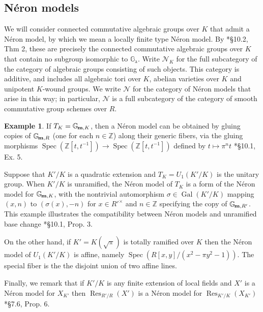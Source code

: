\documentclass[10pt]{amsart}
\theoremstyle{plain}
\theoremstyle{definition}
\newtheorem{example}[theorem]{Example}
\newcommand{\ZZ}{{\mathbb{Z}}}
\newcommand{\Gm}[1]{\mathbb{G}_{\hskip-1pt\textbf{m},#1}}
\DeclareMathOperator{\Gal}{Gal}
\DeclareMathOperator{\Res}{Res}
\newcommand{\Spec}[1]{{\operatorname{Spec}(#1)}}
\begin{document}
\subsection{N\'eron models}\label{ssec:neron}
We will consider connected commutative algebraic groups over $K$ that admit a N\'eron model,
by which we mean a locally finite type N\'eron model.
By \cite{bosch-lutkebohmert-reynaud:NeronModels}*{\S 10.2, Thm 2}, these are precisely the connected
commutative algebraic groups over $K$ that contain no subgroup isomorphic to $\mathbb{G}_\text{a}$.
Write $\mathcal{N}_K$ for the full subcategory of the category of algebraic groups consisting of such objects.
This category is additive, and includes all algebraic tori over $K$, abelian varieties over $K$ and unipotent $K$-wound groups.
We write $\mathcal{N}$ for the category of N\'eron models that arise in this way; in particular, $\mathcal{N}$
is a full subcategory of the category of smooth commutative group schemes over $R$.

\begin{example}
If $T_K = \Gm{K}$, then a N\'eron model can be obtained by gluing copies of $\Gm{R}$ (one for each $n \in \ZZ$) along their generic fibers,
via the gluing morphisms $\Spec{\ZZ[t, t^{-1}]} \to \Spec{\ZZ[t, t^{-1}]}$ defined by $t \mapsto \pi^n t$
\cite{bosch-lutkebohmert-reynaud:NeronModels}*{\S 10.1, Ex. 5}.

Suppose that $K'/K$ is a quadratic extension and $T_K = U_1(K'/K)$ is the unitary group.
When $K'/K$ is unramified, the N\'eron model of $T_K$ is a form of the N\'eron model for $\Gm{K}$, with the nontrivial automorphism
$\sigma \in \Gal(K'/K)$ mapping $(x, n)$ to $(\sigma(x), -n)$ for $x \in R'^\times$ and $n \in \ZZ$ specifying the copy of $\Gm{R'}$.
This example illustrates the compatibility between N\'eron models and unramified base change
\cite{bosch-lutkebohmert-reynaud:NeronModels}*{\S 10.1, Prop. 3}.

On the other hand, if $K' = K(\sqrt{\pi})$ is totally ramified over $K$ then the N\'eron model of $U_1(K'/K)$ is affine, namely
$\Spec{R[x,y] / (x^2 - \pi y^2 - 1)}$.  The special fiber is the the disjoint union of two affine lines.

Finally, we remark that if $K'/K$ is any finite extension of local fields and $X'$ is a N\'eron model for $X_{K'}$ then
$\Res_{R'/R}(X')$ is a N\'eron model for $\Res_{K'/K}(X_{K'})$ \cite{bosch-lutkebohmert-reynaud:NeronModels}*{\S 7.6, Prop. 6}.
\end{example}
\end{document}
